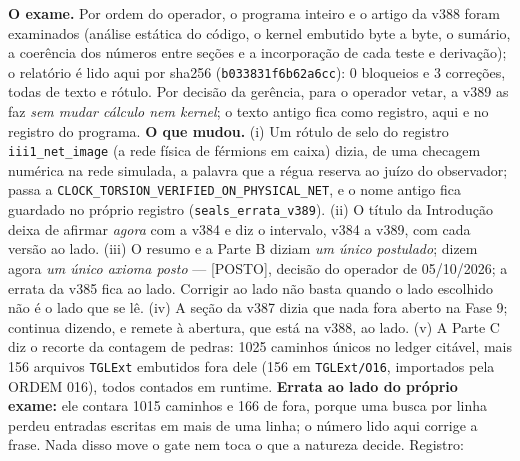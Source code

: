 \documentclass[11pt]{article}
\theoremstyle{definition}\newtheorem{deriv}{Derivação}
\begin{document}
\textbf{O exame.} Por ordem do operador, o programa inteiro e o artigo da v388 foram examinados (análise estática do código, o kernel embutido byte a byte, o sumário, a coerência dos números entre seções e a incorporação de cada teste e derivação); o relatório é lido aqui por sha256 (\texttt{b033831f6b62a6cc}): 0 bloqueios e 3 correções, todas de texto e rótulo. Por decisão da gerência, para o operador vetar, a v389 as faz \emph{sem mudar cálculo nem kernel}; o texto antigo fica como registro, aqui e no registro do programa. \textbf{O que mudou.} (i) Um rótulo de selo do registro \texttt{iii1\_net\_image} (a rede física de férmions em caixa) dizia, de uma checagem numérica na rede simulada, a palavra que a régua reserva ao juízo do observador; passa a \texttt{CLOCK\_\allowbreak{}TORSION\_\allowbreak{}VERIFIED\_\allowbreak{}ON\_\allowbreak{}PHYSICAL\_\allowbreak{}NET}, e o nome antigo fica guardado no próprio registro (\texttt{seals\_errata\_v389}). (ii) O título da Introdução deixa de afirmar \emph{agora} com a v384 e diz o intervalo, v384 a v389, com cada versão ao lado. (iii) O resumo e a Parte B diziam \emph{um único postulado}; dizem agora \emph{um único axioma posto} --- \textsf{[POSTO]}, decisão do operador de 05/10/2026; a errata da v385 fica ao lado. Corrigir ao lado não basta quando o lado escolhido não é o lado que se lê. (iv) A seção da v387 dizia que nada fora aberto na Fase 9; continua dizendo, e remete à abertura, que está na v388, ao lado. (v) A Parte C diz o recorte da contagem de pedras: 1025 caminhos únicos no ledger citável, mais 156 arquivos \texttt{TGLExt} embutidos fora dele (156 em \texttt{TGLExt/O16}, importados pela ORDEM 016), todos contados em runtime. \textbf{Errata ao lado do próprio exame:} ele contara 1015 caminhos e 166 de fora, porque uma busca por linha perdeu entradas escritas em mais de uma linha; o número lido aqui corrige a frase. Nada disso move o gate nem toca o que a natureza decide. Registro: 
\end{document}
